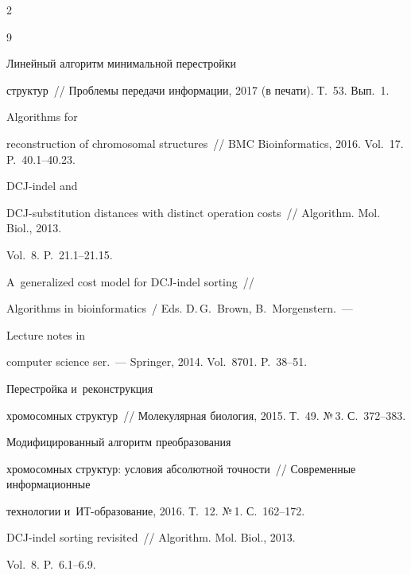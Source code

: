 \begin{multicols}{2}
{{\begin{thebibliography}{9}


 Линейный алгоритм минимальной перестройки 


структур~// Проблемы передачи информации, 2017  (в печати). Т.~53. Вып.~1.




 Algorithms for 


reconstruction of chromosomal structures~// BMC Bioinformatics, 2016. Vol.~17. P.~40.1--40.23.




 DCJ-indel and  


DCJ-substitution distances with distinct operation costs~// Algorithm. Mol. Biol., 2013. 


Vol.~8. P.~21.1--21.15.




 A~generalized cost model for DCJ-indel sorting~// 


Algorithms in bioinformatics~/ Eds. D.\,G.~Brown, B.~Morgenstern.~---


Lecture notes in 


computer science ser.~--- Springer, 2014. Vol.~8701. P.~38--51.




 Перестройка и~реконструкция 


хромосомных структур~// Молекулярная биология, 2015. Т.~49. №\,3. С.~372--383.




 Модифицированный алгоритм преобразования 


хромосомных структур: условия абсолютной точ\-ности~// Современные информационные 


технологии и~ИТ-обра\-зо\-ва\-ние, 2016. Т.~12. №\,1. С.~162--172.




 DCJ-indel sorting revisited~// Algorithm. Mol. Biol., 2013. 


Vol.~8. P.~6.1--6.9.


 \end{thebibliography}





 }


 }





\end{multicols}





